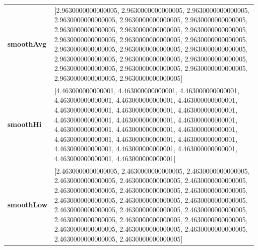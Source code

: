 \begin{table}[H]
	\centering
	\begin{tabularx}{\textwidth}{lX}
		\textbf{smoothAvg}&  [2.9630000000000005, 2.9630000000000005, 2.9630000000000005, 2.9630000000000005, 2.9630000000000005, 2.9630000000000005, 2.9630000000000005, 2.9630000000000005, 2.9630000000000005, 2.9630000000000005, 2.9630000000000005, 2.9630000000000005, 2.9630000000000005, 2.9630000000000005, 2.9630000000000005, 2.9630000000000005, 2.9630000000000005, 2.9630000000000005, 2.9630000000000005, 2.9630000000000005, 2.9630000000000005, 2.9630000000000005, 2.9630000000000005] \\

		\textbf{smoothHi}& [4.463000000000001, 4.463000000000001, 4.463000000000001, 4.463000000000001, 4.463000000000001, 4.463000000000001, 4.463000000000001, 4.463000000000001, 4.463000000000001, 4.463000000000001, 4.463000000000001, 4.463000000000001, 4.463000000000001, 4.463000000000001, 4.463000000000001, 4.463000000000001, 4.463000000000001, 4.463000000000001, 4.463000000000001, 4.463000000000001, 4.463000000000001, 4.463000000000001, 4.463000000000001] \\
		

		
		\textbf{smoothLow} &[2.4630000000000005, 2.4630000000000005, 2.4630000000000005, 2.4630000000000005, 2.4630000000000005, 2.4630000000000005, 2.4630000000000005, 2.4630000000000005, 2.4630000000000005, 2.4630000000000005, 2.4630000000000005, 2.4630000000000005, 2.4630000000000005, 2.4630000000000005, 2.4630000000000005, 2.4630000000000005, 2.4630000000000005, 2.4630000000000005, 2.4630000000000005, 2.4630000000000005, 2.4630000000000005, 2.4630000000000005, 2.4630000000000005] \\
		
		
	\end{tabularx} 
\end{table}


